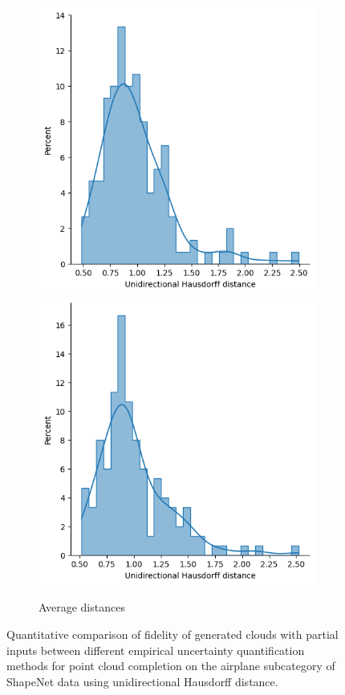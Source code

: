 \begin{figure}[htb]
\begin{subfigure}[t]{0.36\textwidth}
            \includegraphics[width=\textwidth]{figures/ensemble/matched_mean_udhs.png}
            \includegraphics[width=\textwidth]{figures/imle/matched_mean_udhs.png}
            \caption{Average distances}\label{fig:udhsairplane2}
          \end{subfigure}
          \caption{Quantitative comparison of fidelity of generated clouds with partial inputs between different empirical uncertainty quantification methods for point cloud completion on the airplane subcategory of ShapeNet data using unidirectional Hausdorff distance.}
          \label{fig:udhsairplane}
        \end{figure}

